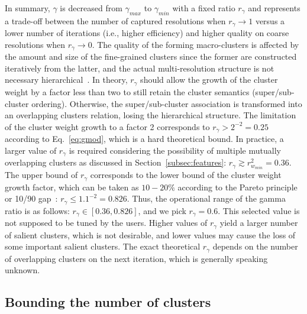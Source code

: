 \documentclass[conference]{IEEEtran}
\begin{document}
In summary, $\gamma$ is decreased from $\gamma_{max}$ to $\gamma_{min}$ with a fixed ratio $r_\gamma$  and represents a trade-off between the number of captured resolutions when $r_\gamma \rightarrow 1$ versus a lower number of iterations (i.e., higher efficiency) and higher quality on coarse resolutions when $r_\gamma \rightarrow 0$. The quality of the forming macro-clusters is affected by the amount and size of the fine-grained clusters since the former are constructed iteratively from the latter, and the actual multi-resolution structure is not necessary hierarchical~\cite{Aren08,Lamb10}.
In theory, $r_\gamma$ should allow the growth of the cluster weight by a factor less than two to still retain the cluster semantics (super/sub-cluster ordering). Otherwise, the super/sub-cluster association is transformed into an overlapping clusters relation, losing the hierarchical structure.
The limitation of the cluster weight growth to a factor 2 corresponds to $r_\gamma > 2^{-2} = 0.25$
according to Eq.~\eqref{eq:gmod}, which is a hard theoretical bound.
In practice,
a larger value of $r_\gamma$ is required considering the possibility of multiple mutually overlapping clusters as discussed in Section~\ref{subsec:features}:  $r_\gamma \gtrsim r_{w_{min}}^2 = 0.36$.
The upper bound of $r_\gamma$ corresponds to the lower bound of the cluster weight growth factor, which can be taken as $10-20\%$ according to the Pareto principle~\cite{Pareto,Geor86} or 10/90 gap~\cite{Curr18}: $r_\gamma \le 
1.1^{-2} = 0.826$. Thus, the operational range of the gamma ratio is as follows: $r_\gamma \in [0.36, 0.826]$, and we pick $r_\gamma = 0.6$.
This selected value is not supposed to be tuned by the users. Higher values of $r_\gamma$ yield a larger number of salient clusters, which is not desirable, and lower values may cause the loss of some important salient clusters. The exact theoretical $r_\gamma$ depends on the number of overlapping clusters on the next iteration, which is generally speaking unknown. 
















\subsection{Bounding the number of clusters}
\label{subsec:clsbound}
\end{document}
